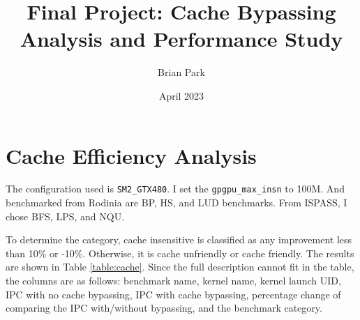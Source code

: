 \documentclass{article}
\title{Final Project: Cache Bypassing Analysis and Performance Study}
\author{Brian Park}
\affil{North Carolina State University, Computer Engineering 786}
\date{April 2023}
\begin{document}
\maketitle

\section{Cache Efficiency Analysis}

The configuration used is \verb|SM2_GTX480|. I set the \verb|gpgpu_max_insn| to 100M. And benchmarked from Rodinia are BP, HS, and LUD benchmarks. From ISPASS, I chose BFS, LPS, and NQU.

To determine the category, cache insensitive is classified as any improvement less than 10\% or -10\%. Otherwise, it is cache unfriendly or cache friendly. The results are shown in Table \ref{table:cache}. Since the full description cannot fit in the table, the columns are as follows: benchmark name, kernel name, kernel launch UID, IPC with no cache bypassing, IPC with cache bypassing, percentage change of comparing the IPC with/without bypassing, and the benchmark category.
\end{document}
